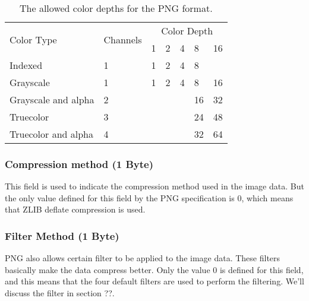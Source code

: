 \begin{table}
  \centering

  \newcommand{\invalid}{\cellcolor{gray}}

  \begin{tabular}{|l|l|l|l|l|l|l|}
    \hline
    \multirow{2}{*}{Color Type} & \multirow{2}{*}{Channels} & \multicolumn{5}{c|}{Color Depth} \\

  \cline{3-7}

    & & 1 & 2 & 4 & 8 & 16 \\

    \hline
    Indexed & 1 & 1 & 2 & 4 & 8 & \invalid \\ \hline
    Grayscale & 1 & 1 & 2 & 4 & 8 & 16  \\ \hline
    Grayscale and alpha & 2 & \invalid& \invalid & \invalid & 16 & 32  \\ \hline
    Truecolor & 3 & \invalid & \invalid & \invalid & 24 & 48  \\ \hline
    Truecolor and alpha & 4 & \invalid & \invalid & \invalid & 32 & 64  \\ \hline

    \hline

  \end{tabular}
  \caption{The allowed color depths for the PNG format.}
  \label{tab:png-color-depths}
\end{table}

\subsubsection*{Compression method (1 Byte)}

This field is used to indicate the compression method used in the
image data. But the only value defined for this field by the PNG
specification is $0$, which means that ZLIB deflate compression is
used.

\subsubsection*{Filter Method (1 Byte)}

PNG also allows certain filter to be applied to the image data. These
filters basically make the data compress better. Only the value $0$ is
defined for this field, and this means that the four default filters
are used to perform the filtering. We'll discuss the filter in section
??.  

